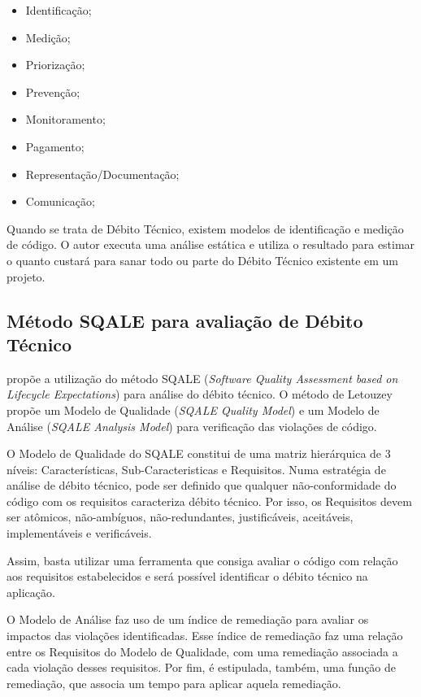 \begin{itemize}
  \item Identificação;
  \item Medição;
  \item Priorização;
  \item Prevenção;
  \item Monitoramento;
  \item Pagamento;
  \item Representação/Documentação;
  \item Comunicação;
\end{itemize}

Quando se trata de Débito Técnico, existem modelos de identificação e medição de
código. O autor \cite{eisenberg} executa uma análise estática e utiliza o
resultado para estimar o quanto custará para sanar todo ou parte do Débito
Técnico existente em um projeto.



\subsection{Método SQALE para avaliação de Débito Técnico}
\cite{letouzey} propõe a utilização do método SQALE (\textit{Software Quality Assessment
based on Lifecycle Expectations}) para análise do débito técnico. O método de
Letouzey propõe um Modelo de Qualidade (\textit{SQALE Quality Model}) e um Modelo de
Análise (\textit{SQALE Analysis Model}) para verificação das violações de código.

O Modelo de Qualidade do SQALE constitui de uma matriz hierárquica de 3 níveis:
Características, Sub-Caracteristicas e Requisitos. Numa estratégia de análise de
débito técnico, pode ser definido que qualquer não-conformidade do código com os
requisitos caracteriza débito técnico. Por isso, os Requisitos devem ser atômicos,
não-ambíguos, não-redundantes, justificáveis, aceitáveis, implementáveis e
verificáveis.

Assim, basta utilizar uma ferramenta que consiga avaliar o código com relação
aos requisitos estabelecidos e será possível identificar o débito técnico na
aplicação.

O Modelo de Análise faz uso de um índice de remediação para avaliar os
impactos das violações identificadas. Esse índice de remediação faz uma relação
entre os Requisitos do Modelo de Qualidade, com uma remediação associada a
cada violação desses requisitos. Por fim, é estipulada, também, uma função de
remediação, que associa um tempo para aplicar aquela remediação.

